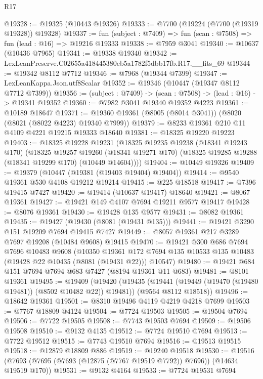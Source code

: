 \begin{lexlean}{R17}
\begin{coremodule}
@19328 := @19325 (@10443 @19326)
@19333 := @7700 (@19224 (@7700 (@19319 @19328)) @19328)
@19337 := fun (subject : @7409) => fun (scan : @7508) => fun (lead : @16) => @19216 @19333
@19338 := @7959 @3041
@19340 := @10637 (@10436 @7965)
@19341 := @19338 @19340
@19342 := LexLeanPreserve.C02655a418445380eb5a1782f5dbb17fb.R17.__fits_69
@19344 := @19342 @8112 @7712
@19346 := @7968 (@19344 @7399)
@19347 := LexLeanKappa.Json.utf8Scalar
@19352 := @19346 (@10447 (@19347 @8112 @7712 @7399))
@19356 := (subject : @7409) -> (scan : @7508) -> (lead : @16) -> @19341 @19352
@19360 := @7982 @3041 @19340 @19352 @4223
@19361 := @10189 @18647
@19371 := @19360 @19361 (@8005 (@8014 @3041)) (@8020 (@8021 (@8022 @4223) @19340 @7999))
@19379 := @8233 @19361 @210 @11 @4109 @4221 @19215 @19333 @18640
@19381 := @18325 @19220 @19223
@19403 := @18325
    @19228
    @19231
    (@18325
      @19235
      @19238
      (@18341 @19243 @170)
      (@18325
        @19257
        @19260
        (@18341 @19271 @170)
        (@18325 @19285 @19288 (@18341 @19299 @170) (@10449 @14604))))
@19404 := @10449 @19326
@19409 := @19379 (@10447 (@19381 (@19403 @19404) @19404))
@19414 := @9540 @19361 @530 @4108 @19212 @19214
@19415 := @225 @18518
@19417 := @7396 @19415 @7427
@19420 := @19414 (@10637 @19417) @18640
@19421 := @8067 @19361
@19427 := @19421 @149 @4107 @7694 @19211 @9577 @19417
@19428 := @8076 @19361
@19430 := @19428 @135 @9577
@19431 := @8082 @19361
@19435 := @19427 (@19430 (@8081 (@19431 @135)))
@19441 := @19421 @3290 @151 @19209 @7694 @19415 @7427
@19449 := @8057 @19361 @217 @3289 @7697 @19208 (@10484 @9608) @19415
@19470 := @19421
    @300
    @686
    @7694
    @7696
    @10483
    @9608
    (@10350
      @19361
      @172
      @7694
      @135
      @10533
      @135
      @10483
      (@19428 @22 @10435 (@8081 (@19431 @22)))
      @10547)
@19480 := @19421 @684 @151 @7694 @7694 @683 @7427 (@8194 @19361 @11 @683)
@19481 := @8101 @19361
@19495 := @19409
    (@19420
      (@19435 (@19441 (@19449 (@19470 (@19480 @19481)) (@8502 @10482 @22)) @19481))
      (@9564 @8112 @18518))
@19496 := @18642 @19361
@19501 := @8310 @19496 @4119 @4219 @4218 @7699
@19503 := @7767 @18809 @4124
@19504 := @7724 @19503
@19505 := @19504 @7694
@19506 := @7722 @19505
@19508 := @7743 @19503 @7694
@19509 := @19506 @19508
@19510 := @9132 @4135
@19512 := @7724 @19510 @7694
@19513 := @7722 @19512
@19515 := @7743 @19510 @7694
@19516 := @19513 @19515
@19518 := @12879 @18809 @886
@19519 := @19240 @19518
@19530 := @19516 (@7693 (@7695 (@7693 (@12875 (@7767 @19519 @7792)) @7696)) (@14634 @19519 @170))
@19531 := @9132 @4164
@19533 := @7724 @19531 @7694

\end{coremodule}
\end{lexlean}
